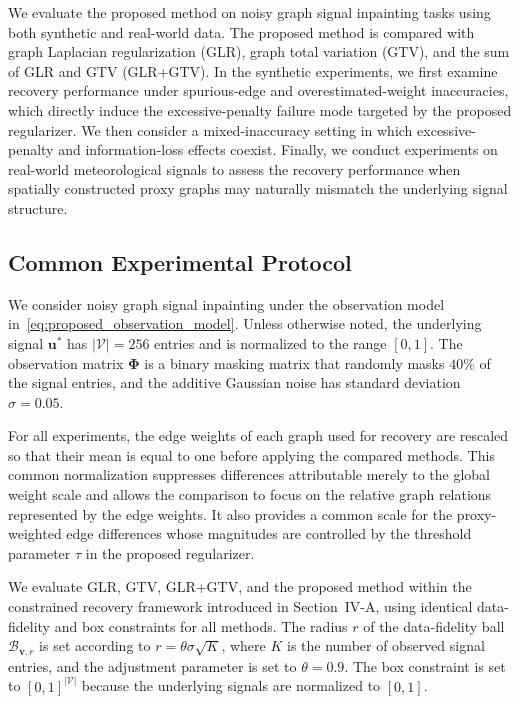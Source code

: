 We evaluate the proposed method on noisy graph signal inpainting tasks using both synthetic and real-world data.
The proposed method is compared with graph Laplacian regularization (GLR), graph total variation (GTV), and the sum of GLR and GTV (GLR+GTV).
In the synthetic experiments, we first examine recovery performance under spurious-edge and overestimated-weight inaccuracies, which directly induce the excessive-penalty failure mode targeted by the proposed regularizer.
We then consider a mixed-inaccuracy setting in which excessive-penalty and information-loss effects coexist.
Finally, we conduct experiments on real-world meteorological signals to assess the recovery performance when spatially constructed proxy graphs may naturally mismatch the underlying signal structure.

\subsection{Common Experimental Protocol}

We consider noisy graph signal inpainting under the observation model in~\eqref{eq:proposed_observation_model}.
Unless otherwise noted, the underlying signal $\mathbf{u}^{\ast}$ has $|\mathcal{V}|=256$ entries and is normalized to the range $[0,1]$.
The observation matrix $\mathbf{\Phi}$ is a binary masking matrix that randomly masks $40\%$ of the signal entries, and the additive Gaussian noise has standard deviation $\sigma=0.05$.

For all experiments, the edge weights of each graph used for recovery are rescaled so that their mean is equal to one before applying the compared methods.
This common normalization suppresses differences attributable merely to the global weight scale and allows the comparison to focus on the relative graph relations represented by the edge weights.
It also provides a common scale for the proxy-weighted edge differences whose magnitudes are controlled by the threshold parameter $\tau$ in the proposed regularizer.

We evaluate GLR, GTV, GLR+GTV, and the proposed method within the constrained recovery framework introduced in Section~IV-A, using identical data-fidelity and box constraints for all methods.
The radius $r$ of the data-fidelity ball $\mathcal{B}_{\mathbf{v},r}$ is set according to $r=\theta\sigma\sqrt{K}$, where $K$ is the number of observed signal entries, and the adjustment parameter is set to $\theta=0.9$.
The box constraint is set to $[0,1]^{|\mathcal{V}|}$ because the underlying signals are normalized to $[0,1]$.

